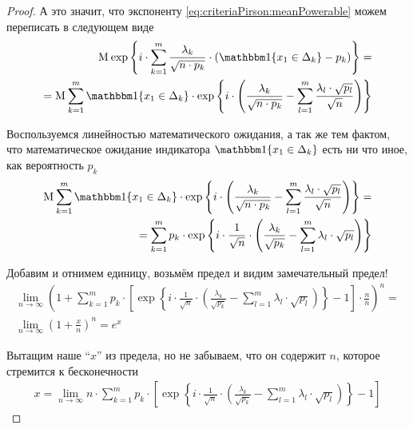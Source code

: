 \begin{proof}
    А это значит, что экспоненту \eqref{eq:criteriaPirson:meanPowerable} можем
    переписать в следующем виде
    \begin{align*}
        \mean{\exp{\left\{ i \cdot \sum_{k=1}^{m}\frac{\lambda_k}{
                \sqrt{n \cdot p_k}} \cdot \left(
                \Indicator{x_1 \in \Delta_k} - p_k \right) \right\}}} = \\
        = \mean{\sum_{k=1}^{m} \Indicator{x_1 \in \Delta_k} \cdot
            \exp{\left\{ i \cdot \left( \frac{\lambda_k}{\sqrt{n \cdot p_k}}
                - \sum_{l=1}^{m} \frac{\lambda_l \cdot \sqrt{p_l}}{\sqrt{n}}
                \right) \right\}}}
    \end{align*}

    Воспользуемся линейностью математического ожидания, а так же тем фактом,
    что математическое ожидание индикатора $\Indicator{x_1 \in \Delta_k}$
    есть ни что иное, как вероятность $p_k$
    \begin{align*}
        \mean{\sum_{k=1}^{m} \Indicator{x_1 \in \Delta_k} \cdot
            \exp{\left\{ i \cdot \left( \frac{\lambda_k}{\sqrt{n \cdot p_k}}
                - \sum_{l=1}^{m} \frac{\lambda_l \cdot \sqrt{p_l}}{\sqrt{n}}
                \right) \right\}}} = \\
        = \sum_{k=1}^{m} p_k \cdot \exp{\left\{ i \cdot \frac{1}{\sqrt{n}}
                 \cdot \left(\frac{\lambda_k}{\sqrt{p_k}}
                    - \sum_{l=1}^{m}\lambda_l \cdot \sqrt{p_l} \right) \right\}}
    \end{align*}

    Добавим и отнимем единицу, возьмём предел и видим замечательный предел!
    \begin{align*}
        \lim_{n \to \infty} \left( 1 + \sum_{k=1}^{m} p_k \cdot \left[
            \exp{\left\{ i \cdot \frac{1}{\sqrt{n}}
                 \cdot \left(\frac{\lambda_k}{\sqrt{p_k}}
                    - \sum_{l=1}^{m}\lambda_l \cdot \sqrt{p_l} \right) \right\}}
            - 1 \right] \cdot \frac{n}{n} \right)^n = \\
        \lim_{n \to \infty} \left( 1 + \frac{x}{n} \right)^n = e^x
    \end{align*}

    Вытащим наше ``$x$'' из предела, но не забываем, что он содержит $n$,
    которое стремится к бесконечности
    \begin{align*}
        x = \lim_{n \to \infty} n \cdot \sum_{k=1}^{m} p_k \cdot \left[
            \exp{\left\{ i \cdot \frac{1}{\sqrt{n}}
                 \cdot \left(\frac{\lambda_k}{\sqrt{p_k}}
                    - \sum_{l=1}^{m}\lambda_l \cdot \sqrt{p_l} \right) \right\}}
            - 1 \right]
    \end{align*}


\end{proof}
